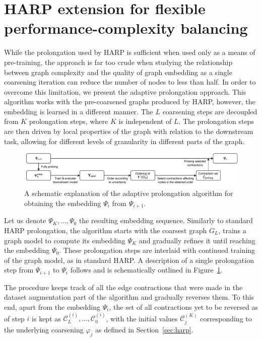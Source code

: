 \section{HARP extension for flexible performance-complexity balancing}\label{sec:our-method}

While the prolongation used by HARP is sufficient when used only as a means of pre-training, the approach is far too crude when studying the relationship between graph complexity and the quality of graph embedding as a single coarsening iteration can reduce the number of nodes to less than half. In order to overcome this limitation, we present the adaptive prolongation approach. This algorithm works with the pre-coarsened graphs produced by HARP, however, the embedding is learned in a different manner. The \( L \) coarsening steps are decoupled from \( K \) prolongation steps, where \( K \) is independent of \( L \). The prolongation steps are then driven by local properties of the graph with relation to the downstream task, allowing for different levels of granularity in different parts of the graph.

\begin{figure}
  \centering
  \includegraphics[width=\textwidth]{images/adaptive-prolongation/adaptive-prolongation.pdf}
  \caption{A schematic explanation of the adaptive prolongation algorithm for obtaining the embedding \( \Psi_{i} \) from \( \Psi_{i + 1} \).}
  \label{fig:adaptive-prolongation}
\end{figure}

Let us denote \( \Psi_K, \dots, \Psi_0 \) the resulting embedding sequence. Similarly to standard HARP prolongation, the algorithm starts with the coarsest graph \( G_L \), trains a graph model to compute its embedding \( \Psi_K \) and gradually refines it until reaching the embedding \( \Psi_0 \). These prolongation steps are interlaid with continued training of the graph model, as in standard HARP. A description of a single prolongation step from \( \Psi_{i + 1} \) to \( \Psi_i \) follows and is schematically outlined in Figure~\ref{fig:adaptive-prolongation}.

The procedure keeps track of all the edge contractions that were made in the dataset augmentation part of the algorithm and gradually reverses them. To this end, apart from the embedding \( \Psi_i \), the set of all contractions yet to be reversed as of step \( i \) is kept as \( \mathcal{C}_L^{(i)}, \dots, \mathcal{C}_0^{(i)} \), with the initial values \( \mathcal{C}_j^{(K)} \) corresponding to the underlying coarsening \( \varphi_j \) as defined in Section~\ref{sec:harp}.

